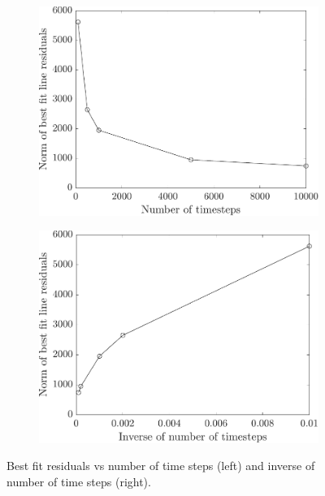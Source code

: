 \begin{figure}[h]
    \centering
    \begin{subfigure}{0.49\textwidth}
        \centering
        \includegraphics[width=\textwidth]{Images/3. Methodology/Timestep average convergence/rests.pdf}
    \end{subfigure}
    \hfill
    \begin{subfigure}{0.49\textwidth}
        \centering
        \includegraphics[width=\textwidth]{Images/3. Methodology/Timestep average convergence/resinvts.pdf}
    \end{subfigure}
    \caption{Best fit residuals vs number of time steps (left) and inverse of number of time steps (right).}
    \label{fig:averesid}
\end{figure}



